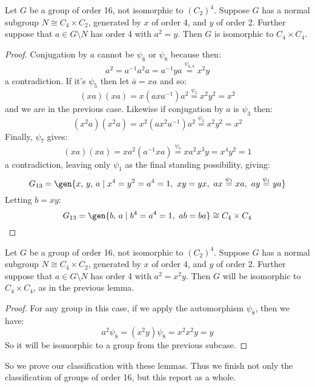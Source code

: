 \begin{lemma}
    Let \(G\) be a group of order 16, not isomorphic to \({(C_{2})}^4\).
    Suppose \(G\) has a normal subgroup \(N \cong C_4 \times C_2\), generated by \(x\) of order 4, and \(y\) of order 2.
    Further suppose that \(a \in G\setminus N\) has order 4 with \(a^2 = y\).
    Then \(G\) is isomorphic to \(C_4 \times C_4\).
\end{lemma}

\begin{proof}
    Conjugation by \(a\) cannot be \(\psi_6\) or \(\psi_8\) because then:
    \[a^2 = a^{-1}a^2 a = a^{-1}ya \overset{\psi_{6,8}}{=} x^2 y\]
    a contradiction.
    If it's \(\psi_5\) then let \(\bar{a} = xa\) and so:
    \[(xa)(xa) = x(axa^{-1})a^2 \overset{\psi_5}{=} x^2 y^2 = x^2\]
    and we are in the previous case.
    Likewise if conjugation by \(a\) is \(\psi_3\) then:
    \[(x^2 a)(x^2 a) = x^2(ax^2 a^{-1})a^2 \overset{\psi_3}{=} x^2 y^2 = x^2\]
    Finally, \(\psi_7\) gives:
    \[(xa)(xa) = xa^2(a^{-1}xa) \overset{\psi_7}{=} xa^2 x^3 y = x^4 y^2 = 1\]
    a contradiction, leaving only \(\psi_1\) as the final standing possibility, giving:
    \[G_{13} = \gen{x,\,y,\,a \mid x^4 = y^2 = a^4 = 1,\ xy = yx,\ ax \overset{\psi_1}{=} xa,\ ay \overset{\psi_1}{=} ya}\]
    Letting \(b = xy\):
    \[G_{13} = \gen{b,\,a \mid b^4 = a^4 = 1,\ ab = ba} \cong C_4 \times C_4\]
\end{proof}

\begin{lemma}
    Let \(G\) be a group of order 16, not isomorphic to \({(C_{2})}^4\).
    Suppose \(G\) has a normal subgroup \(N \cong C_4 \times C_2\), generated by \(x\) of order 4, and \(y\) of order 2.
    Further suppose that \(a \in G\setminus N\) has order 4 with \(a^2 = x^2 y\).
    Then \(G\) will be isomorphic to \(C_4 \times C_4\), as in the previous lemma.
\end{lemma}

\begin{proof}
    For any group in this case, if we apply the automorphism \(\psi_8\), then we have:
    \[a^2\psi_8 = (x^2 y)\psi_8 = x^2 x^2 y = y\]
    So it will be isomorphic to a group from the previous subcase.
\end{proof}

So we prove our classification with these lemmas.
Thus we finish not only the classification of groups of order 16, but this report as a whole.
